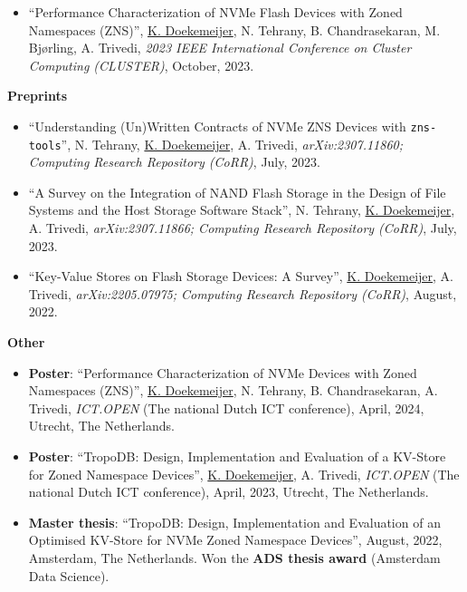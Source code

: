 \documentclass[letterpaper,11pt]{article}
\begin{document}
\begin{itemize}[label={}]
\item
  ``Performance Characterization of NVMe Flash Devices with Zoned Namespaces (ZNS)'', 
  \underline{K. Doekemeijer}, N. Tehrany, B. Chandrasekaran, M. Bjørling, A. Trivedi,
  \textit{2023 IEEE International Conference on Cluster Computing (CLUSTER)}, 
  October, 2023.

\end{itemize}

\textbf{Preprints}
\begin{itemize}[label={}]
\item
  ``Understanding (Un)Written Contracts of NVMe ZNS Devices with \texttt{zns-tools}'', 
  N. Tehrany, \underline{K. Doekemeijer}, A. Trivedi,
  \textit{arXiv:2307.11860; Computing Research Repository (CoRR)}, 
  July, 2023.

\item
  ``A Survey on the Integration of NAND Flash Storage in the Design of File Systems and the Host Storage Software Stack'', 
  N. Tehrany, \underline{K. Doekemeijer}, A. Trivedi,
  \textit{arXiv:2307.11866; Computing Research Repository (CoRR)}, 
  July, 2023.

\item
  ``Key-Value Stores on Flash Storage Devices: A Survey'', 
  \underline{K. Doekemeijer}, A. Trivedi,
  \textit{arXiv:2205.07975; Computing Research Repository (CoRR)}, 
  August, 2022.
\end{itemize}


\textbf{Other}
\begin{itemize}[label={}]
\item
  \textbf{Poster}: 
  ``Performance Characterization of NVMe Devices with Zoned Namespaces (ZNS)'',
  \underline{K. Doekemeijer}, N. Tehrany, B. Chandrasekaran, A. Trivedi,
  \textit{ICT.OPEN} (The national Dutch ICT conference),
  April, 2024, Utrecht, The Netherlands.

\item
  \textbf{Poster}: 
  ``TropoDB: Design, Implementation and Evaluation of a KV-Store for Zoned Namespace Devices'',
  \underline{K. Doekemeijer}, A. Trivedi,
  \textit{ICT.OPEN} (The national Dutch ICT conference),
  April, 2023, Utrecht, The Netherlands.

\item
  \textbf{Master thesis}: 
  ``TropoDB: Design, Implementation and Evaluation of an Optimised KV-Store for NVMe Zoned Namespace Devices'',
  August, 2022, Amsterdam, The Netherlands.
  Won the \textbf{ADS thesis award} (Amsterdam Data Science).
\end{itemize}
\end{document}
